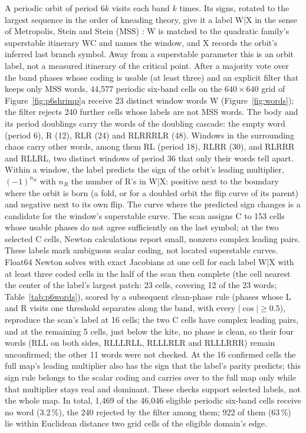 \documentclass[11pt,letterpaper]{article}
\begin{document}
A periodic orbit of period $6k$ visits each band $k$ times. Its signs, rotated to the largest sequence in the order of
kneading theory, give it a label W|X in the sense of Metropolis, Stein and Stein (MSS)
\cite{metropolis1973finite,milnor1988iterated}: W is matched to the quadratic family's superstable itinerary WC and
names the window, and X records the orbit's inferred last branch symbol. Away from a superstable parameter this is an
orbit label, not a measured itinerary of the critical point. After a majority vote over the band phases whose coding is usable (at least three) and an explicit filter that keeps
only MSS words, 44{,}577 periodic six-band cells on the $640\times640$ grid of Figure~\ref{fig:p6shrimp}a receive
23 distinct window words W (Figure~\ref{fig:words}); the filter rejects 240 further cells whose labels are not
MSS words. The body and its period doublings carry the words of the doubling cascade: the empty word (period 6), R (12),
RLR (24) and RLRRRLR (48). Windows in the surrounding chaos carry other words, among them RL (period 18), RLRR (30), and
RLRRR and RLLRL, two distinct windows of period 36 that only their words tell apart. Within a window, the label predicts
the sign of the orbit's leading multiplier, $(-1)^{n_R}$ with $n_R$ the number of R's in W|X: positive next to the
boundary where the orbit is born (a fold, or for a doubled orbit the flip curve of its parent) and negative next to its
own flip. The curve where the predicted sign changes is a candidate for the window's superstable curve. The scan
assigns C to 153 cells whose usable phases do not agree sufficiently on the last symbol; at the two selected C cells,
Newton calculations report small, nonzero complex leading pairs. These labels mark ambiguous scalar coding, not
located superstable curves. Float64 Newton solves with exact Jacobians at one cell for each label W|X with at least three coded cells in the half
of the scan then complete (the cell nearest the center of the label's largest patch: 23 cells, covering 12 of the 23
words; Table~\ref{tab:p6words}), scored by a subsequent clean-phase rule (phases whose L and R visits one threshold
separates along the band, with every $|\cos|\ge0.5$), reproduce the scan's label at 16 cells; the two C cells have
complex leading pairs, and at the remaining 5 cells, just below the kite, no phase is clean, so their four words (RLL on both sides, RLLLRLL,
RLLLRLR and RLLLRRR) remain unconfirmed; the other 11 words were not checked. At the 16 confirmed cells the full map's leading multiplier
also has the sign that the label's parity predicts; this sign rule belongs to the scalar coding and carries over to
the full map only while that multiplier stays real and dominant. These checks support selected labels, not the whole map. In total, 1{,}469 of the
46{,}046 eligible periodic six-band cells receive no word (3.2\,\%), the 240 rejected by the filter among them; 922 of them (63\,\%) lie within Euclidean
distance two grid cells of the eligible domain's edge.
\end{document}
